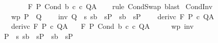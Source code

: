 \begin{isabellebody}
\ \ \ {\isasymLongrightarrow}\ \isanewline
\ \ \ {\isasymGamma}{\isacharcomma}{\isasymTheta}{\isasymturnstile}\isactrlbsub {\isacharslash}F\isactrlesub \ P\ {\isacharparenleft}Cond\ b\ c{}\ c{}{\isacharparenright}\ Q{\isacharcomma}A{\isachardoublequoteclose}\isanewline
%
\isadelimproof
\ \ %
\endisadelimproof
%
\isatagproof
{}\isamarkupfalse%
\ {\isacharparenleft}rule\ CondSwap{\isacharparenright}\ blast{\isacharplus}%
\endisatagproof
{\isafoldproof}%
%
\isadelimproof
\isanewline
%
\endisadelimproof
\isanewline
{}\isamarkupfalse%
\ CondInv{\isacharcolon}\ \isanewline
\ \ \ wp{\isacharcolon}\ {\isachardoublequoteopen}P\ {\isasymsubseteq}\ Q{\isachardoublequoteclose}\ \isanewline
\ \ \ inv{\isacharcolon}\ {\isachardoublequoteopen}Q\ {\isasymsubseteq}\ {\isacharbraceleft}s{\isachardot}\ {\isacharparenleft}s{\isasymin}b\ {\isasymlongrightarrow}\ s{\isasymin}P\ {\isasymand}\ {\isacharparenleft}s{\isasymnotin}b\ {\isasymlongrightarrow}\ s{\isasymin}P\ \isanewline
\ \ \ deriv{\isacharunderscore}c{}{\isacharcolon}\ {\isachardoublequoteopen}{\isasymGamma}{\isacharcomma}{\isasymTheta}{\isasymturnstile}\isactrlbsub {\isacharslash}F\isactrlesub \ P\ c\ Q{\isacharcomma}A{\isachardoublequoteclose}\ \isanewline
\ \ \ deriv{\isacharunderscore}c{}{\isacharcolon}\ {\isachardoublequoteopen}{\isasymGamma}{\isacharcomma}{\isasymTheta}{\isasymturnstile}\isactrlbsub {\isacharslash}F\isactrlesub \ P\ c\ Q{\isacharcomma}A{\isachardoublequoteclose}\isanewline
\ \ \ {\isachardoublequoteopen}{\isasymGamma}{\isacharcomma}{\isasymTheta}{\isasymturnstile}\isactrlbsub {\isacharslash}F\isactrlesub \ P\ {\isacharparenleft}Cond\ b\ c\ c\ Q{\isacharcomma}A{\isachardoublequoteclose}\isanewline
%
\isadelimproof
%
\endisadelimproof
%
\isatagproof
{}\isamarkupfalse%
\ {\isacharminus}\isanewline
\ \ \isamarkupfalse%
\ wp\ inv\isanewline
\ \ \isamarkupfalse%
\ {\isachardoublequoteopen}P\ {\isasymsubseteq}\ {\isacharbraceleft}s{\isachardot}\ {\isacharparenleft}s{\isasymin}b\ {\isasymlongrightarrow}\ s{\isasymin}P\ {\isasymand}\ {\isacharparenleft}s{\isasymnotin}b\ {\isasymlongrightarrow}\ s{\isasymin}P\isanewline

\end{isabellebody}
